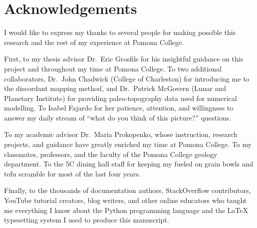 \chapter*{Acknowledgements}

I would like to express my thanks to several people for making possible this research and the rest of my experience at Pomona College. 

First, to my thesis advisor Dr.\ Eric Grosfils for his insightful guidance on this project and throughout my time at Pomona College. To two additional collaborators, Dr.\ John Chadwick (College of Charleston) for introducing me to the discordant mapping method, and Dr.\ Patrick McGovern (Lunar and Planetary Institute) for providing paleo-topography data used for numerical modelling. To Isabel Fajardo for her patience, attention, and willingness to answer my daily stream of ``what do you think of this picture?'' questions.

To my academic advisor Dr.\ Maria Prokopenko, whose instruction, research projects, and guidance have greatly enriched my time at Pomona College. To my classmates, professors, and the faculty of the Pomona College geology department. To the 5C dining hall staff for keeping my fueled on grain bowls and tofu scramble for most of the last four years.

Finally, to the thousands of documentation authors, StackOverflow contributors, YouTube tutorial creators, blog writers, and other online educators who taught me everything I know about the Python programming language and the \LaTeX{} typesetting system I used to produce this manuscript.